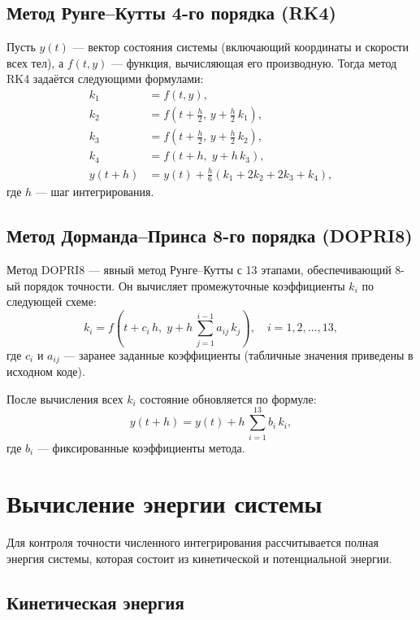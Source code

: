 \documentclass[a4paper,12pt]{article}
\begin{document}
\subsection{Метод Рунге--Кутты 4-го порядка (RK4)}

Пусть \( y(t) \) --- вектор состояния системы (включающий координаты и скорости всех тел), а \( f(t, y) \) --- функция, вычисляющая его производную. Тогда метод RK4 задаётся следующими формулами:
\begin{align}
  k_1 &= f(t, y), \\
  k_2 &= f\left(t + \frac{h}{2},\, y + \frac{h}{2}\, k_1\right), \\
  k_3 &= f\left(t + \frac{h}{2},\, y + \frac{h}{2}\, k_2\right), \\
  k_4 &= f(t + h,\; y + h\, k_3), \\
  y(t + h) &= y(t) + \frac{h}{6} \left( k_1 + 2k_2 + 2k_3 + k_4 \right),
\end{align}
где \( h \) --- шаг интегрирования.

\subsection{Метод Дорманда--Принса 8-го порядка (DOPRI8)}

Метод DOPRI8 --- явный метод Рунге--Кутты с 13 этапами, обеспечивающий 8-ый порядок точности. Он вычисляет промежуточные коэффициенты \( k_i \) по следующей схеме:
\begin{equation}
  k_i = f\left(t + c_i\,h,\; y + h\, \sum_{j=1}^{i-1} a_{ij}\, k_j\right), \quad i = 1, 2, \dots, 13,
\end{equation}
где \( c_i \) и \( a_{ij} \) --- заранее заданные коэффициенты (табличные значения приведены в исходном коде).

После вычисления всех \( k_i \) состояние обновляется по формуле:
\begin{equation}
  y(t+h) = y(t) + h\, \sum_{i=1}^{13} b_i\, k_i,
\end{equation}
где \( b_i \) --- фиксированные коэффициенты метода.

\section{Вычисление энергии системы}

Для контроля точности численного интегрирования рассчитывается полная энергия системы, которая состоит из кинетической и потенциальной энергии.

\subsection{Кинетическая энергия}
\end{document}
